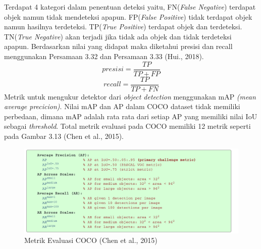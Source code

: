 Terdapat 4 kategori dalam penentuan deteksi yaitu,
FN(\emph{False Negative}) terdapat objek namun tidak mendeteksi apapun.
FP(\emph{False Positive}) tidak terdapat objek namun hasilnya terdeteksi.
TP(\emph{True Positive}) terdapat objek dan terdeteksi.
TN(\emph{True Negative}) akan terjadi jika tidak ada objek dan tidak terdeteksi apapun.
Berdasarkan nilai yang didapat maka diketahui presisi dan recall menggunakan Persamaan 3.32 dan Persamaan 3.33 (Hui., 2018).
\begin{equation}
	presisi = \frac{TP}{TP+FP}
\end{equation}
\begin{equation}
recall = \frac{TP}{TP+FN}
\end{equation}
Metrik untuk mengukur detektor dari \emph{object detection} menggunakan mAP \emph{(mean average precicion)}. Nilai mAP dan AP dalam COCO dataset tidak memiliki perbedaan, dimana mAP adalah rata rata dari setiap AP yang memiliki nilai IoU sebagai \emph{threshold}. Total metrik evaluasi pada COCO memiliki 12 metrik seperti pada Gambar 3.13 (Chen et al., 2015).
\begin{figure}[H]
	\centering
	\includegraphics[width=1\linewidth]{mtrik}
	\caption{Metrik Evaluasi COCO (Chen et al., 2015)}
	\label{fig:mtrik}
\end{figure}

